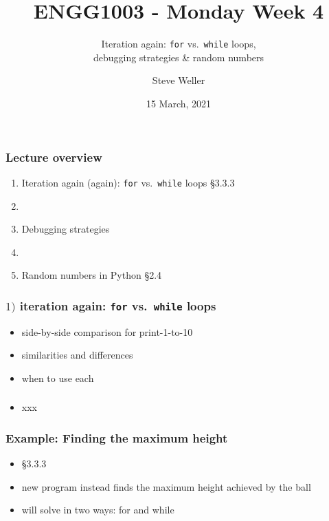 \documentclass[14pt]{beamer}
\title{ENGG1003 - Monday Week 4}
\subtitle{Iteration again: \texttt{for} vs.~\texttt{while} loops, \\ debugging strategies \& random numbers}
\author{Steve Weller}
\institute{University of Newcastle}
\date{15 March, 2021}
\newcommand\red[1]{{\color{red} #1}}
\begin{document}
\framebreak


\begin{frame}[fragile]

\frametitle{Lecture overview}
\begin{enumerate}
	\item Iteration again (again): \texttt{for} vs.~\texttt{while} loops \red{\S3.3.3}

	\item[]
	
	\item Debugging strategies
	
	\item[]
	
	\item Random numbers in Python \red{\S2.4}

\end{enumerate}

\end{frame}


\begin{frame}[fragile]

\frametitle{$1)$ iteration again: \texttt{for} vs.~\texttt{while} loops}

\begin{itemize}
	\item side-by-side comparison for print-1-to-10
	\item similarities and differences
	\item when to use each
\end{itemize}

\end{frame}


\begin{frame}[fragile]

\frametitle{}

\begin{itemize}
	\item xxx
\end{itemize}

\end{frame}


\begin{frame}[fragile]

\frametitle{Example: Finding the maximum height}

\begin{itemize}
	\item \S3.3.3
	\item new program instead finds the maximum height achieved by the ball
	\item will solve in two ways: for and while
\end{itemize}

\end{frame}
\end{document}
